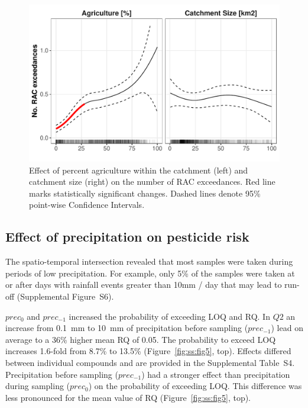\begin{figure}[ht]
  \includegraphics[width=\textwidth]{chapters/smallstreams/figure4.pdf}
  \caption[Effect of percent agriculture within the catchment and catchment size on the number of RAC exceedances.]{Effect of percent agriculture within the catchment (left) and catchment size (right) on the number of RAC exceedances. Red line marks statistically significant changes. Dashed lines denote 95\% point-wise Confidence Intervals.
  }
  \label{fig:ss:fig4}
\end{figure}


\subsection{Effect of precipitation on pesticide risk}
The spatio-temporal intersection revealed that most samples were taken during periods of low precipitation.
For example, only 5\% of the samples were taken at or after days with rainfall events greater than 10mm / day that may lead to run-off (Supplemental Figure~S6). 

$prec_{0}$ and $prec_{-1}$ increased the probability of exceeding LOQ and RQ.
In $Q2$ an increase from 0.1~mm to 10~mm of precipitation before sampling ($prec_{-1}$) lead on average to a 36\% higher mean RQ of 0.05.
The probability to exceed LOQ increases 1.6-fold from 8.7\% to 13.5\% (Figure~\ref{fig:ss:fig5}, top). %
Effects differed between individual compounds and are provided in the Supplemental Table~S4. 
Precipitation before sampling ($prec_{-1}$) had a stronger effect than precipitation during sampling ($prec_{0}$) on the probability of exceeding LOQ. 
This difference was less pronounced for the mean value of RQ (Figure~\ref{fig:ss:fig5}, top). 

